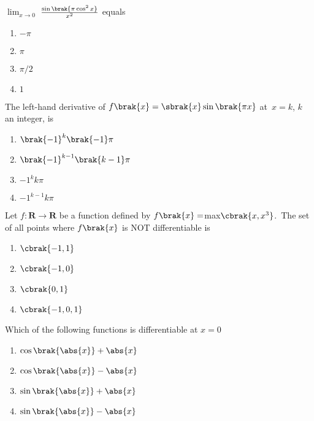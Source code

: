 
\iffalse
  \title{11. Limits, continuity and Differentiability}
  \author{Niketh Prakash Achanta - EE24BTECH11047}
  \section{mcq-single}
\fi
\item %

	$\lim_{x\to0}$  $\frac{\sin\brak{\pi \cos^2 x }}{x^2}$ \: equals \hfill{}
    \begin{enumerate}
     \item $-\pi$
     \item $\pi$
     \item $\pi/2$
     \item $1$\\
     \end{enumerate}

\item %
	The left-hand derivative of $f\brak{x}=\sbrak{x}\sin\brak{\pi x}$ at\ $x=k$, $k$ an integer, is \hfill{}
    \begin{enumerate}
	    \item $\brak{-1}^k \brak{-1} \pi$
	    \item $\brak{-1}^{k-1}\brak{k-1} \pi$
            \item $-1^k k\pi$
     	    \item $-1^{k-1} k\pi$\\
    \end{enumerate}

\item %

	Let $f:\mathbf{R}\rightarrow\mathbf{R}$ be a function defined by $f\brak{x}=$max$\cbrak{x,x^3}$.\ The set of all points where $f\brak{x}$ is NOT differentiable is \hfill{}
    \begin{enumerate}
     \item $\cbrak{-1,1}$
     \item $\cbrak{-1,0}$
     \item $\cbrak{0,1}$
     \item $\cbrak{-1,0,1}$\\
    \end{enumerate}


\item %

	Which of the following functions is differentiable at $x=0$ \hfill{}
    \begin{enumerate}
	    \item $\cos\brak{\abs{x}}+\abs{x}$
	    \item $\cos\brak{\abs{x}}-\abs{x}$
	    \item $\sin\brak{\abs{x}}+\abs{x}$
	    \item $\sin\brak{\abs{x}}-\abs{x}$\\
    \end{enumerate}


